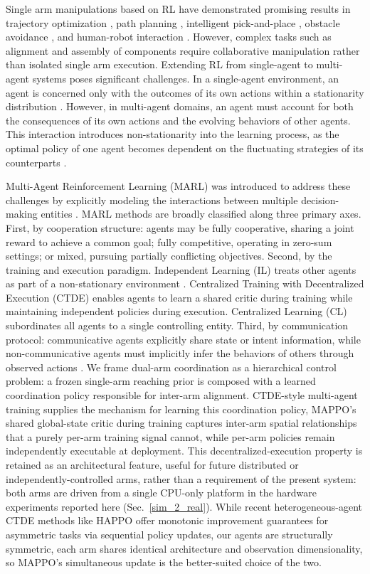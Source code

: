\documentclass[a4paper,fleqn]{cas-dc}
\begin{document}
Single arm manipulations based on RL have demonstrated promising results in trajectory optimization \cite{intro-12, intro-13}, path planning \cite{hemalatha2026cleannav}, intelligent pick-and-place \cite{dahmani2025reinforcement, intro-14, intro-15}, obstacle avoidance \cite{intro-16, intro-17}, and human-robot interaction \cite{intro-18, intro-19}. However, complex tasks such as alignment and assembly of components require collaborative manipulation rather than isolated single arm execution. Extending RL from single-agent to multi-agent systems poses significant challenges. In a single-agent environment, an agent is concerned only with the outcomes of its own actions within a stationarity distribution \cite{intro-21}. However, in multi-agent domains, an agent must account for both the consequences of its own actions and the evolving behaviors of other agents. This interaction introduces non-stationarity into the learning process, as the optimal policy of one agent becomes dependent on the fluctuating strategies of its counterparts \cite{intro-20}.

Multi-Agent Reinforcement Learning (MARL) was introduced to address these challenges by explicitly modeling the interactions between multiple decision-making entities \cite{intro-22}. MARL methods are broadly classified along three primary axes. First, by cooperation structure: agents may be fully cooperative, sharing a joint reward to achieve a common goal; fully competitive, operating in zero-sum settings; or mixed, pursuing partially conflicting objectives. Second, by the training and execution paradigm. Independent Learning (IL) treats other agents as part of a non-stationary environment \cite{IPPO}. Centralized Training with Decentralized Execution (CTDE) enables agents to learn a shared critic during training while maintaining independent policies during execution. Centralized Learning (CL) subordinates all agents to a single controlling entity. Third, by communication protocol: communicative agents explicitly share state or intent information, while non-communicative agents must implicitly infer the behaviors of others through observed actions \cite{intro-23, intro-25}. We frame dual-arm coordination as a hierarchical control problem: a frozen single-arm reaching prior is composed with a learned coordination policy responsible for inter-arm alignment. CTDE-style multi-agent training supplies the mechanism for learning this coordination policy, MAPPO's shared global-state critic during training captures inter-arm spatial relationships that a purely per-arm training signal cannot, while per-arm policies remain independently executable at deployment. This decentralized-execution property is retained as an architectural feature, useful for future distributed or independently-controlled arms, rather than a requirement of the present system: both arms are driven from a single CPU-only platform in the hardware experiments reported here (Sec.~\ref{sim_2_real}). While recent heterogeneous-agent CTDE methods like HAPPO \cite{happo/htrpo} offer monotonic improvement guarantees for asymmetric tasks via sequential policy updates, our agents are structurally symmetric, each arm shares identical architecture and observation dimensionality, so MAPPO's simultaneous update is the better-suited choice of the two.
\end{document}

